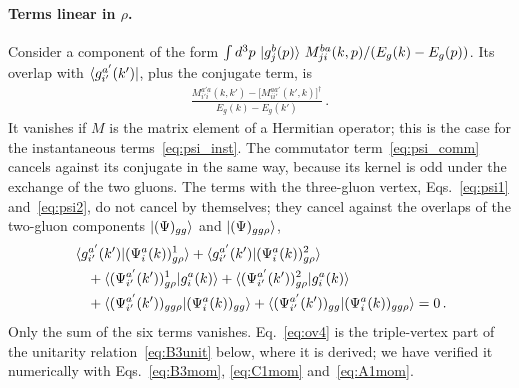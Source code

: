\paragraph{Terms linear in $\rho$.} Consider a component of the form $\int d^3p\,\ket{g^b_j(p)}\,M^{ba}_{ji}(k,p)/(E_g(k)-E_g(p))$. Its overlap with $\bra{g^{a'}_{i'}(k')}$, plus the conjugate term, is
\begin{align}
\frac{M^{a'a}_{i'i}(k,k')-\big[M^{aa'}_{ii'}(k',k)\big]^\dagger}{E_g(k)-E_g(k')}\,.
\end{align}
It vanishes if $M$ is the matrix element of a Hermitian operator; this is the case for the instantaneous terms~\eqref{eq:psi_inst}. The commutator term~\eqref{eq:psi_comm} cancels against its conjugate in the same way, because its kernel is odd under the exchange of the two gluons. The terms with the three-gluon vertex, Eqs.~\eqref{eq:psi1} and~\eqref{eq:psi2}, do not cancel by themselves; they cancel against the overlaps of the two-gluon components $\ket{(\Psi)_{gg}}$ and $\ket{(\Psi)_{gg\rho}}$,
\begin{align}\label{eq:ov4}
&\braket{g^{a'}_{i'}(k')|(\Psi^a_i(k))^1_{g\rho}}+\braket{g^{a'}_{i'}(k')|(\Psi^a_i(k))^2_{g\rho}}\notag\\
&\quad+\braket{(\Psi^{a'}_{i'}(k'))^1_{g\rho}|g^a_i(k)}+\braket{(\Psi^{a'}_{i'}(k'))^2_{g\rho}|g^a_i(k)}\notag\\
&\quad+\braket{(\Psi^{a'}_{i'}(k'))_{gg\rho}|(\Psi^a_i(k))_{gg}}+\braket{(\Psi^{a'}_{i'}(k'))_{gg}|(\Psi^a_i(k))_{gg\rho}}=0\,.
\end{align}
Only the sum of the six terms vanishes. Eq.~\eqref{eq:ov4} is the triple-vertex part of the unitarity relation~\eqref{eq:B3unit} below, where it is derived; we have verified it numerically with Eqs.~\eqref{eq:B3mom}, \eqref{eq:C1mom} and~\eqref{eq:A1mom}.

